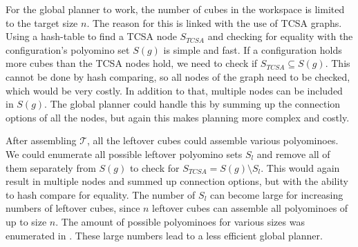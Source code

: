 For the global planner to work, the number of cubes in the workspace is limited to the target size $n$.
The reason for this is linked with the use of TCSA graphs.
Using a hash-table to find a TCSA node $S_\textit{TCSA}$ and checking for equality with the configuration's polyomino set $S(g)$ is simple and fast.
If a configuration holds more cubes than the TCSA nodes hold, we need to check if $S_\textit{TCSA} \subseteq S(g)$.
This cannot be done by hash comparing, so all nodes of the graph need to be checked, which would be very costly.
In addition to that, multiple nodes can be included in $S(g)$.
The global planner could handle this by summing up the connection options of all the nodes, but again this makes planning more complex and costly.

After assembling $\mathcal{T}$, all the leftover cubes could assemble various polyominoes.
We could enumerate all possible leftover polyomino sets $S_l$ and remove all of them separately from $S(g)$ to check for $S_\textit{TCSA} = S(g) \setminus S_l$.
This would again result in multiple nodes and summed up connection options, but with the ability to hash compare for equality.
The number of $S_l$ can become large for increasing numbers of leftover cubes, since $n$ leftover cubes can assemble all polyominoes of up to size $n$.
The amount of possible polyominoes for various sizes was enumerated in \cite{Lu2021}.
These large numbers lead to a less efficient global planner.



